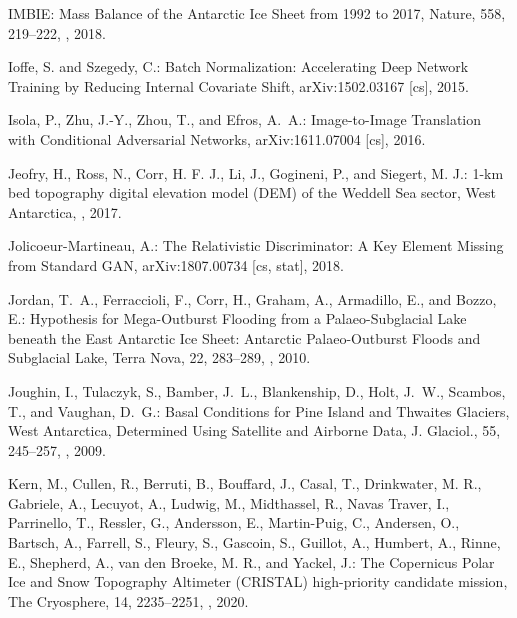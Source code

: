 \documentclass[tc, noline]{copernicus}
\begin{document}
\begin{thebibliography}{95}
{IMBIE}:
Mass Balance of the Antarctic Ice Sheet from 1992 to 2017,
Nature,
558, 219--222, , 2018.

Ioffe, S. and Szegedy, C.:
Batch Normalization: Accelerating Deep Network Training by Reducing Internal Covariate Shift,
arXiv:1502.03167 [cs], 2015.

Isola, P., Zhu, J.-Y., Zhou, T., and Efros, A.~A.:
Image-to-Image Translation with Conditional Adversarial Networks,
arXiv:1611.07004 [cs], 2016.


Jeofry, H., Ross, N., Corr, H. F. J., Li, J., Gogineni, P., and Siegert, M. J.: 1-km bed topography digital elevation model (DEM) of the Weddell Sea sector, West Antarctica, , 2017.

{Jolicoeur-Martineau}, A.:
The Relativistic Discriminator: A Key Element Missing from Standard GAN,
arXiv:1807.00734 [cs, stat], 2018.

Jordan, T.~A., Ferraccioli, F., Corr, H., Graham, A., Armadillo, E., and Bozzo, E.:
Hypothesis for Mega-Outburst Flooding from a Palaeo-Subglacial Lake beneath the East Antarctic Ice Sheet: Antarctic Palaeo-Outburst Floods and Subglacial Lake,
Terra Nova,
22, 283--289, , 2010.

Joughin, I., Tulaczyk, S., Bamber, J.~L., Blankenship, D., Holt, J.~W., Scambos, T., and Vaughan, D.~G.:
Basal Conditions for Pine Island and Thwaites Glaciers, West Antarctica, Determined Using Satellite and Airborne Data,
J. Glaciol.,
55, 245--257, , 2009.


Kern, M., Cullen, R., Berruti, B., Bouffard, J., Casal, T., Drinkwater, M. R., Gabriele, A., Lecuyot, A., Ludwig, M., Midthassel, R., Navas Traver, I., Parrinello, T., Ressler, G., Andersson, E., Martin-Puig, C., Andersen, O., Bartsch, A., Farrell, S., Fleury, S., Gascoin, S., Guillot, A., Humbert, A., Rinne, E., Shepherd, A., van den Broeke, M. R., and Yackel, J.: The Copernicus Polar Ice and Snow Topography Altimeter (CRISTAL) high-priority candidate mission, The Cryosphere, 14, 2235--2251, , 2020.


\end{thebibliography}
\end{document}
